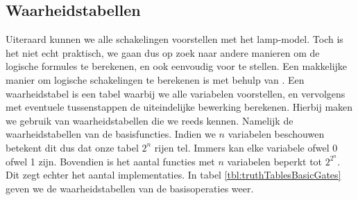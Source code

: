 \subsection{Waarheidstabellen}
Uiteraard kunnen we alle schakelingen voorstellen met het lamp-model. Toch is het niet echt praktisch, we gaan dus op zoek naar andere manieren om de logische formules te berekenen, en ook eenvoudig voor te stellen. Een makkelijke manier om logische schakelingen te berekenen is met behulp van . Een waarheidstabel is een tabel waarbij we alle variabelen voorstellen, en vervolgens met eventuele tussenstappen de uiteindelijke bewerking berekenen. Hierbij maken we gebruik van waarheidstabellen die we reeds kennen. Namelijk de waarheidstabellen van de basisfuncties. Indien we $n$ variabelen beschouwen betekent dit dus dat onze tabel $2^n$ rijen tel. Immers kan elke variabele ofwel 0 ofwel 1 zijn. Bovendien is het aantal functies met $n$ variabelen beperkt tot $2^{2^n}$. Dit zegt echter het aantal implementaties. In tabel \ref{tbl:truthTablesBasicGates} geven we de waarheidstabellen van de basisoperaties weer.
\begin{table}[htb]
\centering
{}
\caption{Waarheidstabellen van de basisoperaties.}
\label{tbl:truthTablesBasicGates}
\end{table}
